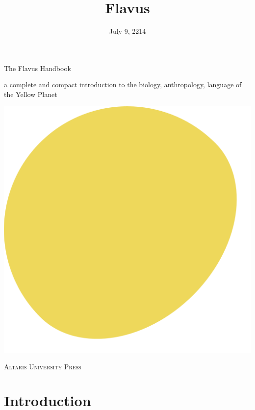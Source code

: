 \documentclass[10pt,oneside]{memoir}
\title{Flavus}
\date{July 9, 2214}
\begin{document}


\begin{center}
    
\vspace{100pt}

{\HUGE The Flavus Handbook}

\vspace{50pt}

{\Huge a complete and compact introduction to the biology, anthropology, language of the Yellow Planet}

\vspace{150pt}

\includegraphics[scale=0.4]{planet.svg.png}

\vfill

{\Large \textsc{Altaris University Press}}

\end{center}



\pagebreak

\section{Introduction}
\end{document}
